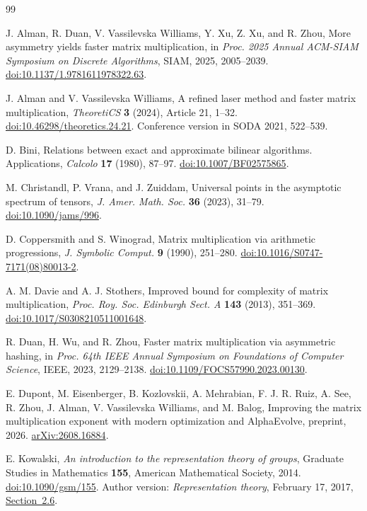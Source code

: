 \documentclass[11pt]{article}
\theoremstyle{definition}
\theoremstyle{remark}
\numberwithin{equation}{section}
\begin{document}
\begin{thebibliography}{99}

J. Alman, R. Duan, V. Vassilevska Williams, Y. Xu, Z. Xu, and R. Zhou,
More asymmetry yields faster matrix multiplication,
in \emph{Proc. 2025 Annual ACM-SIAM Symposium on Discrete Algorithms},
SIAM, 2025, 2005--2039.
\href{https://doi.org/10.1137/1.9781611978322.63}{doi:10.1137/1.9781611978322.63}.

J. Alman and V. Vassilevska Williams, A refined laser method and faster
matrix multiplication, \emph{TheoretiCS} \textbf{3} (2024), Article 21, 1--32.
\href{https://doi.org/10.46298/theoretics.24.21}{doi:10.46298/theoretics.24.21}.
Conference version in SODA 2021, 522--539.

D. Bini, Relations between exact and approximate bilinear algorithms.
Applications, \emph{Calcolo} \textbf{17} (1980), 87--97.
\href{https://doi.org/10.1007/BF02575865}{doi:10.1007/BF02575865}.

M. Christandl, P. Vrana, and J. Zuiddam, Universal points in the
asymptotic spectrum of tensors, \emph{J. Amer. Math. Soc.}
\textbf{36} (2023), 31--79.
\href{https://doi.org/10.1090/jams/996}{doi:10.1090/jams/996}.

D. Coppersmith and S. Winograd, Matrix multiplication via arithmetic
progressions, \emph{J. Symbolic Comput.} \textbf{9} (1990), 251--280.
\href{https://doi.org/10.1016/S0747-7171(08)80013-2}{doi:10.1016/S0747-7171(08)80013-2}.

A. M. Davie and A. J. Stothers, Improved bound for complexity of
matrix multiplication, \emph{Proc. Roy. Soc. Edinburgh Sect. A}
\textbf{143} (2013), 351--369.
\href{https://doi.org/10.1017/S0308210511001648}{doi:10.1017/S0308210511001648}.

R. Duan, H. Wu, and R. Zhou, Faster matrix multiplication via asymmetric
hashing, in \emph{Proc. 64th IEEE Annual Symposium on Foundations of
Computer Science}, IEEE, 2023, 2129--2138.
\href{https://doi.org/10.1109/FOCS57990.2023.00130}{doi:10.1109/FOCS57990.2023.00130}.

E. Dupont, M. Eisenberger, B. Kozlovskii, A. Mehrabian, F. J. R. Ruiz,
A. See, R. Zhou, J. Alman, V. Vassilevska Williams, and M. Balog,
Improving the matrix multiplication exponent with modern optimization
and AlphaEvolve, preprint, 2026.
\href{https://arxiv.org/abs/2608.16884}{arXiv:2608.16884}.

E. Kowalski, \emph{An introduction to the representation theory of groups},
Graduate Studies in Mathematics \textbf{155}, American Mathematical
Society, 2014.
\href{https://doi.org/10.1090/gsm/155}{doi:10.1090/gsm/155}.
Author version: \emph{Representation theory}, February 17, 2017,
\href{https://people.math.ethz.ch/~kowalski/representation-theory.pdf}{Section~2.6}.


\end{thebibliography}
\end{document}
